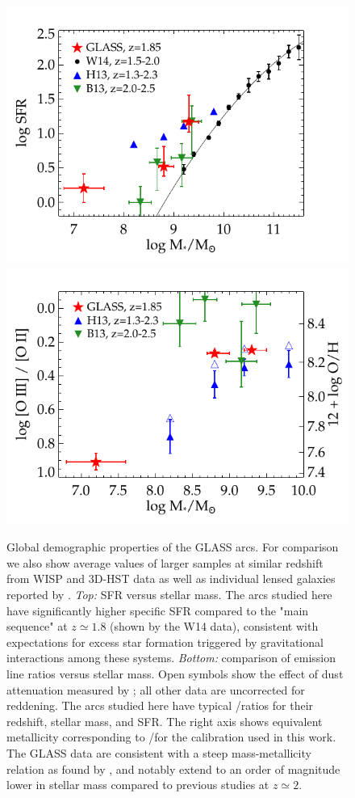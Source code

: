 \begin{figure}
    \includegraphics[width=.5\textwidth]{figures/figure_ms_corr.pdf}
    \includegraphics[width=.5\textwidth]{figures/figure_o32_corr.pdf}
    \caption[Global demographic properties of the GLASS arcs.]{Global demographic properties of the GLASS arcs. For comparison we also show average values of
    larger samples at similar redshift from WISP \citep[][H13]{Henry2013} and 3D-HST \citep[][W14]{Whitaker2014}
    data as well as individual lensed galaxies reported by \citet[][B13]{Belli2013}. \emph{ Top:} SFR versus
    stellar mass.  The arcs studied here have significantly higher specific SFR compared to the "main sequence"
    at $z\simeq1.8$ (shown by the W14 data), consistent with expectations for excess star formation triggered by
    gravitational interactions among these systems. \emph{ Bottom:} comparison of emission line ratios versus
    stellar mass. Open symbols show the effect of dust attenuation measured by \cite{Henry2013}; all other data
    are uncorrected for reddening. The arcs studied here have typical \OIII/\OII ratios for their redshift,
    stellar mass, and SFR. The right axis shows equivalent metallicity corresponding to \OIII/\OII for the
    \cite{Maiolino2008} calibration used in this work. The GLASS data are consistent with a steep
    mass-metallicity relation as found by \cite{Henry2013}, and notably extend to an order of magnitude lower in
    stellar mass compared to previous studies at $z\simeq2$.\label{fig:properties}}
\end{figure}


